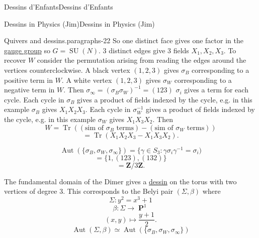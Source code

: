 \documentclass[10pt,]{book}
\numberwithin{equation}{section}
\newcommand{\inv}{^{-1}}
\newcommand{\ZZ}{\mathbf{Z}}
\DeclareMathOperator{\PP}{\mathbf{P}}
\DeclareMathOperator{\trace}{Tr}
\DeclareMathOperator{\Aut}{Aut}
\DeclareMathOperator{\specialunitary}{SU}
\begin{document}
\begin{chapterptx}{Dessins d'Enfants}{}{Dessins d'Enfants}{}{}
\begin{sectionptx}{Dessins in Physics (Jim)}{}{Dessins in Physics (Jim)}{}{}
\begin{paragraphs}{Quivers and dessins.}{paragraphs-22}
So one distinct face gives one factor in the \hyperref[def-gauge-transformations]{gauge group} so \(G = \specialunitary (N)\). 3 distinct edges give 3 fields \(X_1, X_2, X_3\). To recover \(W\) consider the permutation arising from reading the edges around the vertices counterclockwise. A black vertex \((1,2,3)\) gives \(\sigma_B\) corresponding to a positive term in \(W\). A white vertex \((1,2,3)\) gives \(\sigma_W\) corresponding to a negative term in \(W\). Then \(\sigma_\infty = (\sigma_B\sigma_W)\inv = (123)\) \(\sigma_i\) gives a term for each cycle. Each cycle in \(\sigma_B\) gives a product of fields indexed by the cycle, e.g. in this example \(\sigma_B\) gives \(X_1X_2X_3\). Each cycle in \(\sigma_W\inv\) gives a product of fields indexed by the cycle, e.g. in this example \(\sigma_W\) gives \(X_1X_3X_2\). Then%
\begin{equation*}
W = \trace((\text{sim of }\sigma_B\text{ terms}) - (\text{sim of }\sigma_W\text{ terms}))
\end{equation*}
%
\begin{equation*}
= \trace(X_1X_2X_3 - X_1X_3X_2)\text{.}
\end{equation*}
%
\par
\hypertarget{p-778}{}%
%
\begin{equation*}
\Aut( \{\sigma_B,\sigma_W,\sigma_\infty\}) = \{ \gamma\in S_3: \gamma\sigma_i \gamma\inv = \sigma_i)
\end{equation*}
%
\begin{equation*}
= \{1,(123), (132)\}
\end{equation*}
%
\begin{equation*}
= \ZZ/3\ZZ\text{.}
\end{equation*}
%
\par
\hypertarget{p-779}{}%
The fundamental domain of the Dimer gives a \hyperref[def-dessin-denfant]{dessin} on the torus with two vertices of degree 3. This corresponds to the Belyi pair \((\Sigma, \beta)\) where%
\begin{equation*}
\Sigma \colon y^2 = x^3 + 1
\end{equation*}
%
\begin{equation*}
\beta \colon \Sigma  \to \PP^1
\end{equation*}
%
\begin{equation*}
(x,y) \mapsto \frac{y+1}{2}\text{.}
\end{equation*}
%
\begin{equation*}
\Aut(\Sigma, \beta) \simeq \Aut(\{\sigma_B,\sigma_W, \sigma_\infty\})
\end{equation*}

\end{paragraphs}
\end{sectionptx}
\end{chapterptx}
\end{document}
